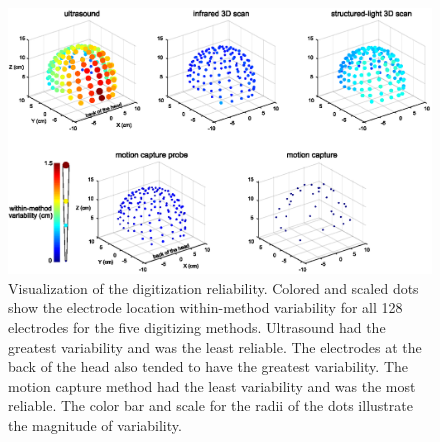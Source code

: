 \documentclass{UCF_ETD}
\begin{document}
\begin{figure}[h!]
    \centering
    \includegraphics[scale=1.0]{img/result1.eps}
    \caption{Visualization of the digitization reliability. Colored and scaled dots show the electrode location within-method variability for all 128 electrodes for the five digitizing methods. Ultrasound had the greatest variability and was the least reliable. The electrodes at the back of the head also tended to have the greatest variability. The motion capture method had the least variability and was the most reliable. The color bar and scale for the radii of the dots illustrate the magnitude of variability.}
    \label{fig:r1}
\end{figure}
\end{document}
